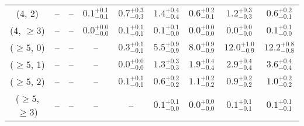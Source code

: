 \begin{table}[h!]
{\begin{tabular}{ccccccccc}
	(4, 2) & -- & -- & $0.1^{+ 0.1 }_{- 0.1 }$ & $0.7^{+ 0.3 }_{- 0.3 }$ & $1.4^{+ 0.4 }_{- 0.4 }$ & $0.6^{+ 0.2 }_{- 0.1 }$ & $1.2^{+ 0.3 }_{- 0.3 }$ & $0.6^{+ 0.2 }_{- 0.1 }$ \\[0.5ex] 
	(4, $\ge3$) & -- & -- & $0.0^{+ 0.0 }_{- 0.0 }$ & $0.1^{+ 0.1 }_{- 0.1 }$ & $0.1^{+ 0.1 }_{- 0.0 }$ & $0.0^{+ 0.0 }_{- 0.0 }$ & $0.0^{+ 0.0 }_{- 0.0 }$ & $0.1^{+ 0.1 }_{- 0.0 }$ \\[0.5ex] 
	($\ge5$, 0) & -- & -- & -- & $0.3^{+ 0.1 }_{- 0.1 }$ & $5.5^{+ 0.9 }_{- 0.9 }$ & $8.0^{+ 0.9 }_{- 0.9 }$ & $12.0^{+ 1.0 }_{- 0.9 }$ & $12.2^{+ 0.8 }_{- 0.8 }$ \\[0.5ex] 
	($\ge5$, 1) & -- & -- & -- & $0.0^{+ 0.0 }_{- 0.0 }$ & $1.3^{+ 0.3 }_{- 0.3 }$ & $1.9^{+ 0.4 }_{- 0.4 }$ & $2.9^{+ 0.4 }_{- 0.4 }$ & $3.6^{+ 0.4 }_{- 0.4 }$ \\[0.5ex] 
	($\ge5$, 2) & -- & -- & -- & $0.1^{+ 0.1 }_{- 0.1 }$ & $0.6^{+ 0.2 }_{- 0.2 }$ & $1.1^{+ 0.2 }_{- 0.2 }$ & $0.9^{+ 0.2 }_{- 0.2 }$ & $1.0^{+ 0.2 }_{- 0.2 }$ \\[0.5ex] 
	($\ge5$, $\ge3$) & -- & -- & -- & -- & $0.1^{+ 0.1 }_{- 0.0 }$ & $0.0^{+ 0.0 }_{- 0.0 }$ & $0.1^{+ 0.1 }_{- 0.1 }$ & $0.1^{+ 0.1 }_{- 0.1 }$ \\[0.5ex] 
	\hline
	\hline
\end{tabular}}
\end{table}
